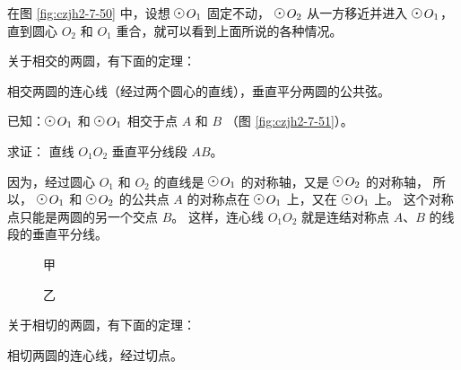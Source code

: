 

在图 \ref{fig:czjh2-7-50} 中，设想 $\yuan\,O_1$ 固定不动， $\yuan\,O_2$ 从一方移近并进入 $\yuan\,O_1$，
直到圆心 $O_2$ 和 $O_1$ 重合，就可以看到上面所说的各种情况。

关于相交的两圆，有下面的定理：

\begin{dingli}[定理]
    相交两圆的连心线（经过两个圆心的直线），垂直平分两圆的公共弦。
\end{dingli}

已知：$\yuan\,O_1$ 和 $\yuan\,O_1$ 相交于点 $A$ 和 $B$ （图 \ref{fig:czjh2-7-51}）。

求证： 直线 $O_1O_2$ 垂直平分线段 $AB$。

\zhengming 因为，经过圆心 $O_1$ 和 $O_2$ 的直线是 $\yuan\,O_1$ 的对称轴，又是 $\yuan\,O_2$ 的对称轴，
所以， $\yuan\,O_1$ 和 $\yuan\,O_2$ 的公共点 $A$ 的对称点在 $\yuan\,O_1$ 上，又在 $\yuan\,O_1$ 上。
这个对称点只能是两圆的另一个交点 $B$。 这样，连心线 $O_1O_2$ 就是连结对称点 $A$、$B$ 的线段的垂直平分线。

\begin{figure}[htbp]
    \centering
    \begin{minipage}[b]{5.2cm}
        \centering
        
        \caption*{} %
        \caption{}\label{fig:czjh2-7-51}
    \end{minipage}
    \qquad
    \begin{minipage}[b]{10.5cm}
        \centering
        \begin{minipage}[b]{5.6cm}
            \centering
            
            \caption*{甲}
        \end{minipage}
        \begin{minipage}[b]{4cm}
            \centering
            
            \caption*{乙}
        \end{minipage}
        \caption{}\label{fig:czjh2-7-52}
    \end{minipage}
\end{figure}


关于相切的两圆，有下面的定理：

\begin{dingli}[定理]
    相切两圆的连心线，经过切点。
\end{dingli}

